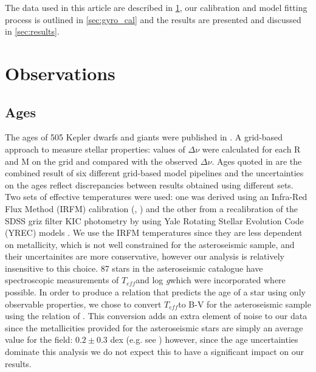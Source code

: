 \documentclass[10pt,preprint]{aastex}
\newcommand{\logg}{log \emph{g}}
\newcommand{\teff}{$T_{eff}$}
\begin{document}
The data used in this article are described in \textsection \ref{sec:data}, our calibration and model fitting process is outlined in \textsection \ref{sec:gyro_cal} and the results are presented and discussed in \textsection \ref{sec:results}.

\section{Observations}
\label{sec:data}

\subsection{Ages}
\label{sec:ages}

The ages of 505 Kepler dwarfs and giants were published in \citet{Chaplin2013}.
A grid-based approach to measure stellar properties: values of $\Delta\nu$ were calculated for each R and M on the grid and compared with the observed $\Delta\nu$.
Ages quoted in \citet{Chaplin2013} are the combined result of six different grid-based model pipelines and the uncertainties on the ages reflect discrepancies between results obtained using different sets.
Two sets of effective temperatures were used: one was derived using an Infra-Red Flux Method (IRFM) calibration (\citealt{Casagrande2010}, \citealt{SilvaAguirre2012}) and the other from a recalibration of the SDSS griz filter KIC photometry by \citet{Pinsonneault2012} using Yale Rotating Stellar Evolution Code (YREC) models \citep{Demarque2004}.
We use the IRFM temperatures since they are less dependent on metallicity, which is not well constrained for the asteroseismic sample, and their uncertainites are more conservative, however our analysis is relatively insensitive to this choice.
87 stars in the asteroseismic catalogue have spectroscopic measurements of \teff and \logg which were incorporated where possible.
In order to produce a relation that predicts the age of a star using only observable properties, we chose to convert \teff to B-V for the asteroseismic sample using the relation of \citet{Sekiguchi2000}.
This conversion adds an extra element of noise to our data since the metallicities provided for the asteroseismic stars are simply an average value for the field: $0.2\pm0.3$ dex (e.g. see \citealt{Silva_Aguirre}) however, since the age uncertainties dominate this analysis we do not expect this to have a significant impact on our results.
\end{document}
